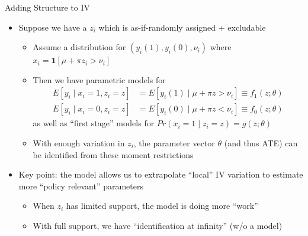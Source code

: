 \documentclass[11pt,english]{beamer}
\begin{document}
\begin{frame}{Adding Structure to IV}

\vspace{0.2cm}
\begin{itemize}
\item Suppose we have a $z_i$ which is as-if-randomly assigned + excludable\smallskip
\begin{itemize}
\item Assume a distribution for $(y_i(1),y_i(0),\nu_i)$ where $x_i=\mathbf{1}[\mu+\pi z_i>\nu_i]$\smallskip\pause{}
\item Then we have parametric models for
\begin{align*}
E[y_i\mid x_i=1,z_i=z]&=E[y_i(1)\mid \mu+\pi z>\nu_i]\equiv f_1(z;\theta)\\
E[y_i\mid x_i=0,z_i=z]&=E[y_i(0)\mid \mu+\pi z<\nu_i]\equiv f_0(z;\theta)
\end{align*}
as well as ``first stage'' models for $Pr(x_i=1\mid z_i=z)=g(z;\theta)$ \pause{}\medskip
\item With enough variation in $z_i$, the parameter vector $\theta$ (and thus ATE) can be identified from these moment restrictions 
\end{itemize}\bigskip\pause{}

\item Key point: the model allows us to extrapolate ``local'' IV variation to estimate more ``policy relevant'' parameters\smallskip
\begin{itemize}
\item When $z_i$ has limited support, the model is doing more ``work''\smallskip
\item With full support, we have ``identification at infinity'' (w/o a model)
\end{itemize}
\end{itemize}
\end{frame}
\end{document}
